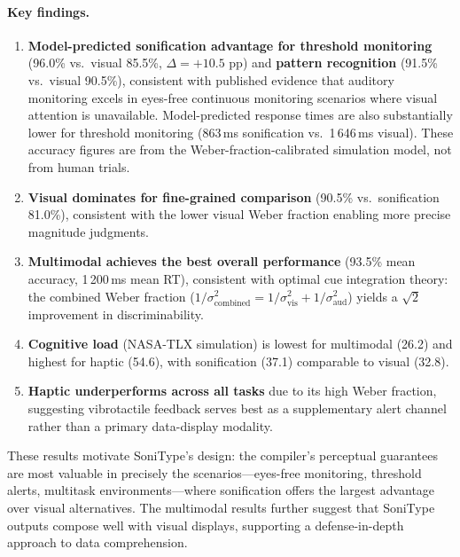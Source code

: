 \documentclass[sigchi, nonacm]{acmart}
\begin{document}
\paragraph{Key findings.}
\begin{enumerate}
\item \textbf{Model-predicted sonification advantage for threshold monitoring} (96.0\% vs.\
      visual 85.5\%, $\Delta = +10.5$ pp) and \textbf{pattern recognition}
      (91.5\% vs.\ visual 90.5\%), consistent with published evidence that auditory monitoring excels in eyes-free
      continuous monitoring scenarios where visual attention is unavailable.
      Model-predicted response times are also substantially lower for threshold monitoring
      (863\,ms sonification vs.\ 1\,646\,ms visual). These accuracy figures are from the Weber-fraction-calibrated simulation model, not from human trials.
\item \textbf{Visual dominates for fine-grained comparison} (90.5\% vs.\
      sonification 81.0\%), consistent with the lower visual Weber fraction
      enabling more precise magnitude judgments.
\item \textbf{Multimodal achieves the best overall performance} (93.5\% mean
      accuracy, 1\,200\,ms mean RT), consistent with optimal cue integration
      theory: the combined Weber fraction ($1/\sigma^2_{\text{combined}} =
      1/\sigma^2_{\text{vis}} + 1/\sigma^2_{\text{aud}}$) yields a $\sqrt{2}$
      improvement in discriminability.
\item \textbf{Cognitive load} (NASA-TLX simulation) is lowest for multimodal
      (26.2) and highest for haptic (54.6), with sonification (37.1) comparable
      to visual (32.8).
\item \textbf{Haptic underperforms across all tasks} due to its high Weber
      fraction, suggesting vibrotactile feedback serves best as a supplementary
      alert channel rather than a primary data-display modality.
\end{enumerate}

These results motivate SoniType's design: the compiler's perceptual guarantees
are most valuable in precisely the scenarios---eyes-free monitoring, threshold
alerts, multitask environments---where sonification offers the largest
advantage over visual alternatives.  The multimodal results further suggest
that SoniType outputs compose well with visual displays, supporting
a defense-in-depth approach to data comprehension.
\end{document}
